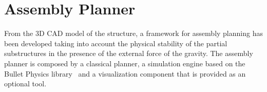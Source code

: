 \documentclass[letterpaper, 12pt, conference]{ieeeconf}    %
\begin{document}

\section{Assembly Planner}
	\label{sec:assembly_sequence}

From the 3D CAD model of the structure, a framework for assembly planning has been developed taking into account the physical stability of the partial substructures in the presence of the external force of the gravity. The assembly planner is composed by a classical planner, a simulation engine based on the Bullet Physics library~\cite{bullet} and a visualization component that is provided as an optional tool. 
\end{document}
